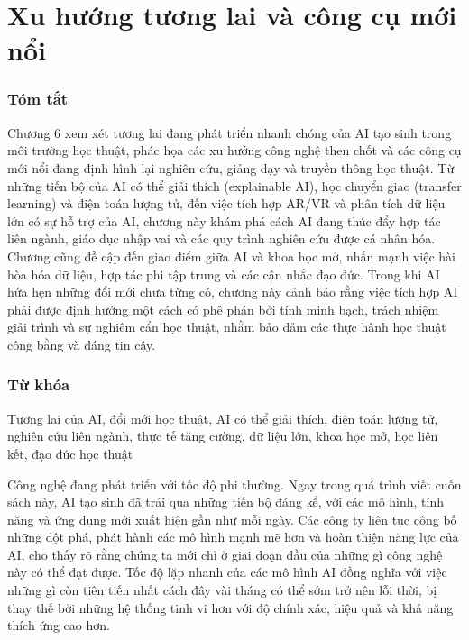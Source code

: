 \chapter{Xu hướng tương lai và công cụ mới nổi}

\subsection{Tóm tắt}

Chương 6 xem xét tương lai đang phát triển nhanh chóng của AI tạo sinh trong môi trường học thuật, phác họa các xu hướng công nghệ then chốt và các công cụ mới nổi đang định hình lại nghiên cứu, giảng dạy và truyền thông học thuật. Từ những tiến bộ của AI có thể giải thích (explainable AI), học chuyển giao (transfer learning) và điện toán lượng tử, đến việc tích hợp AR/VR và phân tích dữ liệu lớn có sự hỗ trợ của AI, chương này khám phá cách AI đang thúc đẩy hợp tác liên ngành, giáo dục nhập vai và các quy trình nghiên cứu được cá nhân hóa. Chương cũng đề cập đến giao điểm giữa AI và khoa học mở, nhấn mạnh việc hài hòa hóa dữ liệu, hợp tác phi tập trung và các cân nhắc đạo đức. Trong khi AI hứa hẹn những đổi mới chưa từng có, chương này cảnh báo rằng việc tích hợp AI phải được định hướng một cách có phê phán bởi tính minh bạch, trách nhiệm giải trình và sự nghiêm cẩn học thuật, nhằm bảo đảm các thực hành học thuật công bằng và đáng tin cậy.

\subsection{Từ khóa}

Tương lai của AI, đổi mới học thuật, AI có thể giải thích, điện toán lượng tử, nghiên cứu liên ngành, thực tế tăng cường, dữ liệu lớn, khoa học mở, học liên kết, đạo đức học thuật

Công nghệ đang phát triển với tốc độ phi thường. Ngay trong quá trình viết cuốn sách này, AI tạo sinh đã trải qua những tiến bộ đáng kể, với các mô hình, tính năng và ứng dụng mới xuất hiện gần như mỗi ngày. Các công ty liên tục công bố những đột phá, phát hành các mô hình mạnh mẽ hơn và hoàn thiện năng lực của AI, cho thấy rõ rằng chúng ta mới chỉ ở giai đoạn đầu của những gì công nghệ này có thể đạt được. Tốc độ lặp nhanh của các mô hình AI đồng nghĩa với việc những gì còn tiên tiến nhất cách đây vài tháng có thể sớm trở nên lỗi thời, bị thay thế bởi những hệ thống tinh vi hơn với độ chính xác, hiệu quả và khả năng thích ứng cao hơn.

